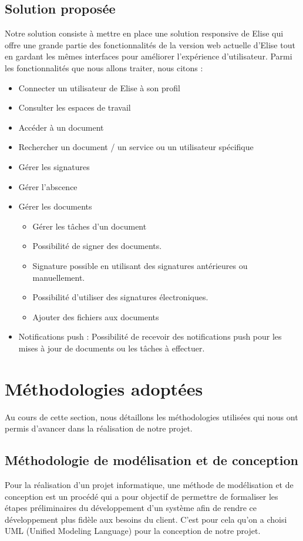\subsection{Solution proposée}
Notre solution consiste à mettre en place une solution responsive de Elise qui offre une grande partie des fonctionnalités de la version web actuelle d'Elise tout en gardant les mêmes interfaces pour améliorer l'expérience d'utilisateur. Parmi les fonctionnalités que nous allons traiter, nous citons :

\begin{itemize}
  \item Connecter un utilisateur de Elise à son profil
  \item Consulter les espaces de travail
  \item Accéder à un document
  \item Rechercher un document / un service ou un utilisateur spécifique
  \item Gérer les signatures
  \item Gérer l'abscence
  \item Gérer les documents
  \begin{itemize}
    \item Gérer les tâches d'un document
    \item Possibilité de signer des documents.
    \item Signature possible en utilisant des signatures antérieures ou manuellement.
    \item Possibilité d'utiliser des signatures électroniques.
    \item	Ajouter des fichiers aux documents
  \end{itemize}
  \item Notifications push : Possibilité de recevoir des notifications push pour les mises à jour de documents ou les tâches à effectuer.
\end{itemize}

\section{Méthodologies adoptées}
Au cours de cette section, nous détaillons les méthodologies utilisées qui nous ont permis d'avancer dans la réalisation de notre projet.

\subsection{Méthodologie de modélisation et de conception}
Pour la réalisation d'un projet informatique, une méthode de modélisation et de conception est un procédé qui a pour objectif de permettre de formaliser les étapes préliminaires du développement d'un système afin de rendre ce développement plus fidèle aux besoins du client. C'est pour cela qu'on a choisi UML (Unified Modeling Language) pour la conception de notre projet.\\


